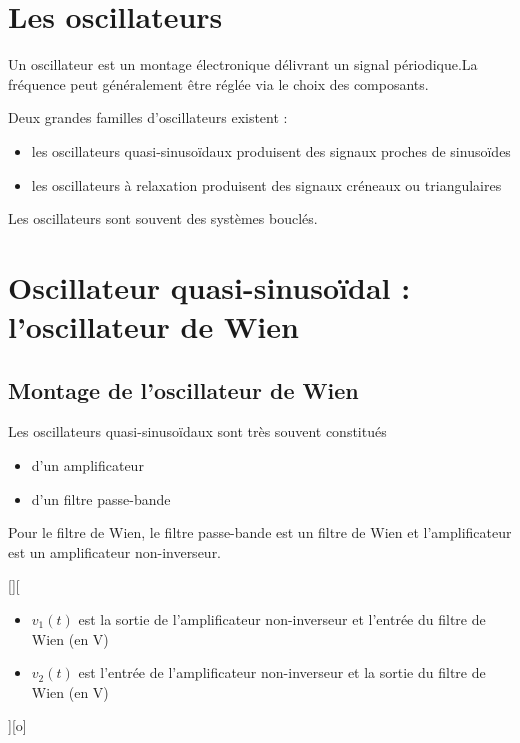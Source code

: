 \section{Les oscillateurs}

Un oscillateur est un montage électronique délivrant un signal périodique.La fréquence peut généralement être réglée via le choix des composants.

Deux grandes familles d'oscillateurs existent :
\begin{itemize}
  \item les oscillateurs quasi-sinusoïdaux produisent des signaux proches de sinusoïdes
  \item les oscillateurs à relaxation produisent des signaux créneaux ou triangulaires
\end{itemize}

Les oscillateurs sont souvent des systèmes bouclés.

\section{Oscillateur quasi-sinusoïdal : l'oscillateur de Wien}
\subsection{Montage de l'oscillateur de Wien}

Les oscillateurs quasi-sinusoïdaux sont très souvent constitués
\begin{itemize}
  \item d'un amplificateur
  \item d'un filtre passe-bande
\end{itemize}

Pour le filtre de Wien, le filtre passe-bande est un filtre de Wien et l'amplificateur est un amplificateur non-inverseur.

[]{\schema{}{5cm}}[%
\begin{itemize}
  \item $v_1(t)$ est la sortie de l'amplificateur non-inverseur et l'entrée du filtre de Wien (en \unit{V})
  \item $v_2(t)$ est l'entrée de l'amplificateur non-inverseur et la sortie du filtre de Wien (en \unit{V})
\end{itemize}][o]


